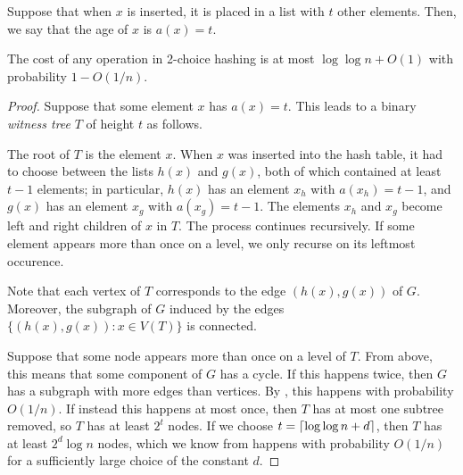 Suppose that when $x$ is inserted, it is placed in a list with $t$
other elements. Then, we say that the age of $x$ is $a(x) = t$.
\begin{thm}
  The cost of any operation in 2-choice hashing is at most
  $\log \log n + O(1)$ with probability $1 - O(1/n)$.
\end{thm}
\begin{proof}
  Suppose that some element $x$ has $a(x) = t$. This leads to a binary
  \emph{witness tree} $T$ of height $t$ as follows.

  The root of $T$ is the element $x$. When $x$ was inserted into the
  hash table, it had to choose between the lists $h(x)$ and $g(x)$,
  both of which contained at least $t - 1$ elements; in particular,
  $h(x)$ has an element $x_h$ with $a(x_h) = t - 1$, and $g(x)$ has an
  element $x_g$ with $a(x_g) = t - 1$. The elements $x_h$ and $x_g$
  become left and right children of $x$ in $T$. The process continues
  recursively. If some element appears more than once on a level, we
  only recurse on its leftmost occurence.

  Note that each vertex of $T$ corresponds to the edge $(h(x), g(x))$
  of $G$. Moreover, the subgraph of $G$ induced by the edges
  $\{(h(x), g(x)) : x \in V(T)\}$ is connected.

  Suppose that some node appears more than once on a level of
  $T$. From above, this means that some component of $G$ has a
  cycle. If this happens twice, then $G$ has a subgraph with more
  edges than vertices. By , this happens
  with probability $O(1/n)$. If instead this happens at most once,
  then $T$ has at most one subtree removed, so $T$ has at least $2^t$
  nodes. If we choose $t = {\lceil \log \log n + d \rceil}$, then $T$ has at
  least $2^d \log n$ nodes, which we know from
   happens with probability $O(1/n)$
  for a sufficiently large choice of the constant $d$.
\end{proof}


